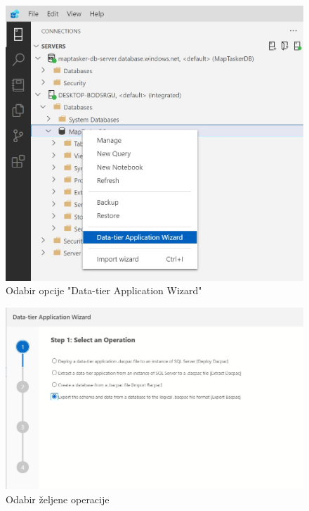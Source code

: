 			\begin{figure}[H]
				 \includegraphics[width=\linewidth]{./slike/baza3.jpg}
				  \centering
				  \caption{Odabir opcije "Data-tier Application Wizard"}
			  \end{figure}
	
			\vspace{25mm}
	
			\begin{figure}[H]
				 \includegraphics[width=\linewidth]{./slike/baza4.jpg}
				  \centering
				  \caption{Odabir željene operacije}
			  \end{figure}
			
			\vspace{15mm}
	
